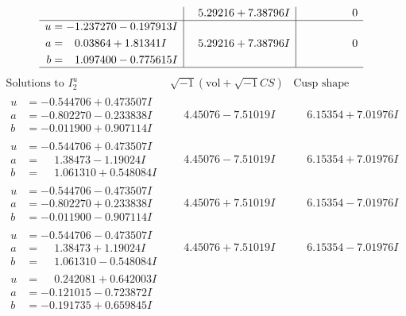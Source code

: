 \documentclass[1p]{elsarticle_modified}
\theoremstyle{definition}
\newcommand{\I}{\sqrt{-1}}
\begin{document}
$$\begin{array}{c|c|c}
 & \phantom{-}5.29216 + 7.38796 I & \phantom{-0.000000 } 0 \\ \hline\begin{aligned}
u &= -1.237270 - 0.197913 I \\
a &= \phantom{-}0.03864 + 1.81341 I \\
b &= \phantom{-}1.097400 - 0.775615 I\end{aligned}
 & \phantom{-}5.29216 + 7.38796 I & \phantom{-0.000000 } 0\\
 \hline 
 \end{array}$$\newpage$$\begin{array}{c|c|c}  
\text{Solutions to }I^u_{2}& \I (\text{vol} + \sqrt{-1}CS) & \text{Cusp shape}\\
 \hline 
\begin{aligned}
u &= -0.544706 + 0.473507 I \\
a &= -0.802270 - 0.233838 I \\
b &= -0.011900 + 0.907114 I\end{aligned}
 & \phantom{-}4.45076 - 7.51019 I & \phantom{-}6.15354 + 7.01976 I \\ \hline\begin{aligned}
u &= -0.544706 + 0.473507 I \\
a &= \phantom{-}1.38473 - 1.19024 I \\
b &= \phantom{-}1.061310 + 0.548084 I\end{aligned}
 & \phantom{-}4.45076 - 7.51019 I & \phantom{-}6.15354 + 7.01976 I \\ \hline\begin{aligned}
u &= -0.544706 - 0.473507 I \\
a &= -0.802270 + 0.233838 I \\
b &= -0.011900 - 0.907114 I\end{aligned}
 & \phantom{-}4.45076 + 7.51019 I & \phantom{-}6.15354 - 7.01976 I \\ \hline\begin{aligned}
u &= -0.544706 - 0.473507 I \\
a &= \phantom{-}1.38473 + 1.19024 I \\
b &= \phantom{-}1.061310 - 0.548084 I\end{aligned}
 & \phantom{-}4.45076 + 7.51019 I & \phantom{-}6.15354 - 7.01976 I \\ \hline\begin{aligned}
u &= \phantom{-}0.242081 + 0.642003 I \\
a &= -0.121015 - 0.723872 I \\
b &= -0.191735 + 0.659845 I\end{aligned}

\end{array}$$
\end{document}
